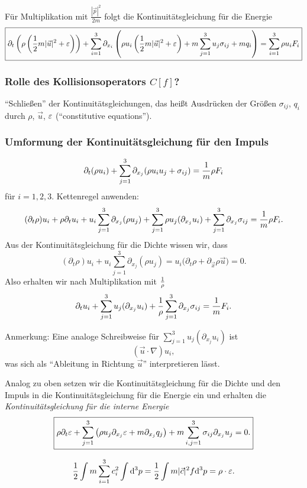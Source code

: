 Für Multiplikation mit $\frac{|\vec{p}|^2}{2m}$ folgt die Kontinuitätsgleichung
für die Energie
\[ \boxed{\partial_t \left( \rho \left( \frac{1}{2} m |\vec{u}|^2 + \varepsilon \right) \right)
+ \sum_{i=1}^3 \partial_{x_i} \left( \rho u_i \left( \frac{1}{2} m |\vec{u}|^2 +
    \varepsilon \right) + m \sum_{j=1}^3 u_j \sigma_{ij} + m q_i \right)
= \sum_{i=1}^3 \rho u_i F_i} \]

\subsubsection*{Rolle des Kollisionsoperators $C[f]$?}
``Schließen'' der Kontinuitätsgleichungen, das heißt Ausdrücken der Größen
$\sigma_{ij}$, $q_i$ durch $\rho$, $\vec{u}$, $\varepsilon$ (``constitutive
equations'').

\subsubsection*{Umformung der Kontinuitätsgleichung für den Impuls}
\[ \partial_t (\rho u_i) +
  \sum_{j=1}^3 \partial_{x_j}( \rho u_i u_j + \sigma_{ij})
  = \frac{1}{m} \rho F_i \]
für $i = 1,2,3$. Kettenregel anwenden:
\[ (\partial_t \rho) u_i + \rho \partial_t u_i + u_i \sum_{j=1}^3
  \partial_{x_j} (\rho u_j) + \sum_{j=1}^3 \rho u_j (\partial_{x_j} u_i) +
  \sum_{j=1}^3 \partial_{x_j} \sigma_{ij} = \frac{1}{m} \rho F_i. \]
Aus der Kontinuitätsgleichung für die Dichte wissen wir, dass
\[ (\partial_t \rho) u_i + u_i \sum_{j=1}^3 \partial_{x_j} (\rho u_j) =  
  u_i \big( \partial_t \rho + \partial_{\vec{x}} \rho \vec{u} \big) = 0. \]
Also erhalten wir nach Multiplikation mit $\frac{1}{\rho}$
\[ \partial_t u_i + \sum_{j=1}^3 u_j (\partial_{x_j} u_i) +
  \frac{1}{\rho} \sum_{j=1}^3 \partial_{x_j} \sigma_{ij}
  = \frac{1}{m} F_i. \]

Anmerkung: Eine analoge Schreibweise für $\sum_{j=1}^3 u_j (\partial_{x_j} u_i)$
ist
\[ (\vec{u} \cdot \nabla) u_i, \]
was sich als ``Ableitung in Richtung $\vec{u}$'' interpretieren lässt.

Analog zu oben setzen wir die Kontinuitätsgleichung für die Dichte und den
Impuls in die Kontinuitätsgleichung für die Energie ein und erhalten die
\emph{Kontinuitätsgleichung für die interne Energie}
\[ \boxed{ \rho \partial_t \varepsilon
    + \sum_{j=1}^3 \left( \rho u_j \partial_{x_j} \varepsilon
      + m \partial_{x_j} q_j \right)
    + m \sum_{i,j=1}^3 \sigma_{ij} \partial_{x_j} u_j
  = 0.} \]

\begin{rmrk*}
  \[ \frac{1}{2} \int m \sum_{i=1}^3 c_i^2 \int \mathrm{d}^3 p =
    \frac{1}{2} \int m |\vec{c}|^2 f \mathrm{d}^3 p =
    \rho \cdot \varepsilon. \]
\end{rmrk*}

